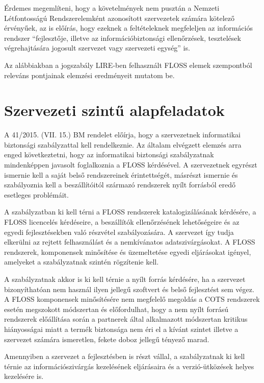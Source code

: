 \documentclass[12pt,magyar,a4paper,oneside]{scrreprt}
\begin{document}
Érdemes megemlíteni, hogy a követelmények nem pusztán a Nemzeti
Létfontosságú Rendszerelemként azonosított szervezetek számára kötelező
érvényűek, az is előírás, hogy ezeknek a feltételeknek megfeleljen az
információs rendszer ``fejlesztője, illetve az információbiztonsági
ellenőrzések, tesztelések végrehajtására jogosult szervezet vagy
szervezeti egység'' is.

Az alábbiakban a jogszabály LIRE-ben felhasznált FLOSS elemek
szempontból releváns pontjainak elemzési eredményeit mutatom be.

\hypertarget{szervezeti-szintux171-alapfeladatok}{%
\section{Szervezeti szintű
alapfeladatok}\label{szervezeti-szintux171-alapfeladatok}}

A 41/2015. (VII. 15.) BM rendelet előírja, hogy a szervezetnek
informatikai biztonsági szabályzattal kell rendelkeznie. Az általam
elvégzett elemzés arra enged következtetni, hogy az informatikai
biztonsági szabályzatnak mindenképpen javasolt foglalkoznia a FLOSS
kérdésével. A szervezetnek egyrészt ismernie kell a saját belső
rendszereinek érintettségét, másrészt ismernie és szabályoznia kell a
beszállítóitól származó rendszerek nyílt forrásból eredő esetleges
problémáit.

A szabályzatban ki kell térni a FLOSS rendszerek katalogizálásának
kérdésére, a FLOSS licencelés kérdéseire, a beszállítók ellenőrzésének
lehetőségeire és az egyedi fejlesztésekben való részvétel
szabályozására. A szervezet így tudja elkerülni az rejtett felhasználást
és a nemkívánatos adatszivárgásokat. A FLOSS rendszerek, komponensek
minősítése és üzemeltetése egyedi eljárásokat igényel, amelyeket a
szabályzatnak szintén rögzítenie kell.

A szabályzatnak akkor is ki kell térnie a nyílt forrás kérdésére, ha a
szervezet bizonyíthatóan nem használ ilyen jellegű szoftvert és belső
fejlesztést sem végez. A FLOSS komponensek minősítésére nem megfelelő
megoldás a COTS rendszerek esetén megszokott módszertan és előfordulhat,
hogy a nem nyílt forrású rendszerek előállítása során a partnerek által
alkalmazott módszertan kritikus hiányosságai miatt a termék biztonsága
nem éri el a kívánt szintet illetve a szervezet számára ismeretlen,
fekete doboz jellegű tényező marad.

Amennyiben a szervezet a fejlesztésben is részt vállal, a szabályzatnak
ki kell térnie az információszivárgás kezelésének eljárásaira és a
verzió-ütközések helyes kezelésére is.
\end{document}
